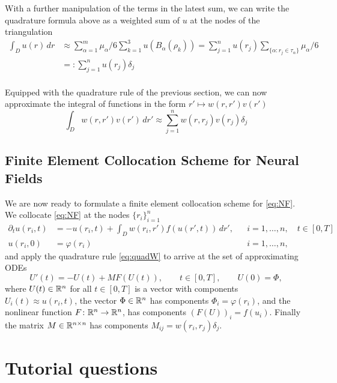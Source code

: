 \documentclass[a4paper]{siamonline220329}
\theoremstyle{plain}
\renewcommand\phi\varphi
\begin{document}
With a further manipulation of the terms in the latest sum, we can write the quadrature
formula above as a weighted sum of $u$ at the nodes of the triangulation 
\[
  \begin{aligned}
  \int_{D} u(r) \,d r
  &
  \approx
  \sum_{\alpha=1}^m \mu_\alpha/6 \sum_{k=1}^3 u(B_\alpha(\rho_k))
  =
  \sum_{j=1}^{n} u(r_j) \sum_{\{ \alpha \colon r_j \in \tau_\alpha \}}
  \mu_\alpha/6
   \\
  &
  =:
  \sum_{j=1}^{n} u(r_j) \delta_j
   \\
  \end{aligned}
\]

Equipped with the quadrature rule of the previous section, we can now approximate the
integral of functions in the form $r' \mapsto w(r,r') v(r')$ 
\begin{equation}\label{eq:quadW}
  \int_{D} w(r,r') v(r')\,dr' \approx \sum_{j=1}^n w(r,r_j) v(r_j) \delta_j
\end{equation}

\subsection{Finite Element Collocation Scheme for Neural Fields}\label{ssec:scheme} 
We are now ready to formulate a finite element collocation scheme for \cref{eq:NF}.
We collocate \cref{eq:NF} at the nodes $\{ r_i \}_{i=1}^n$
\[
  \begin{aligned}
    \partial_{t} u(r_i,t) & = -u(r_i,t) + \int_{D} w(r_i,r') f(u(r',t))\,d r',
                        && i=1,\ldots,n, \quad t \in [0,T] \\
    u(r_i,0) & = \phi(r_i)
                        && i=1,\ldots,n,
  \end{aligned}
\]
and apply the quadrature rule \cref{eq:quadW} to arrive at the set of approximating ODEs
\begin{equation}\label{eq:ODE}
  U'(t) = -U(t) + MF(U(t)), \qquad t \in [0,T], \qquad U(0) = \Phi,
\end{equation}
where $U(t) \in \mathbb{R}^n$ for all $t \in [0,T]$ is a vector with components $U_i(t)
\approx u(r_i,t)$, the vector $\Phi \in \mathbb{R}^n$ has components $\Phi_i = \varphi(r_i)$, and the
nonlinear function $F \colon \mathbb{R}^n \to \mathbb{R}^n$, has components $(F(U))_i = f(u_i)$.
Finally the matrix $M \in \mathbb{R}^{n \times n}$ has components $M_{ij} =
w(r_i,r_j)\delta_j$.

\section{Tutorial questions}\label{sec:question} 
\end{document}
